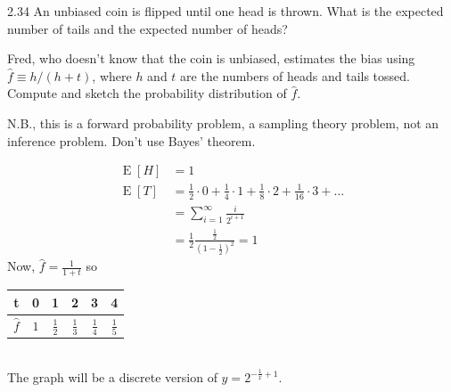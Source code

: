 \documentclass[12pt, a4paper]{article}
\begin{document}
\begin{prob}{2.34}
    An unbiased coin is flipped until one head is thrown. What is the expected number of tails and the expected number of heads?
    
    Fred, who doesn't know that the coin is unbiased, estimates the bias using $\hat{f} \equiv h/(h + t)$, where $h$ and $t$ are the numbers of heads and tails tossed. Compute and sketch the probability distribution of $\hat{f}$.
    
    N.B., this is a forward probability problem, a sampling theory problem, not an inference problem. Don't use Bayes' theorem.
\end{prob}
\begin{sol}
    \begin{align*}
    \operatorname{E}[H] &= 1 \\
    \operatorname{E}[T] &= \frac{1}{2} \cdot 0 + \frac{1}{4} \cdot 1 + \frac{1}{8} \cdot 2 + \frac{1}{16} \cdot 3 + \dots \\
    &= \sum_{i=1}^{\infty} \frac{i}{2^{i+1}} \\
    &= \frac{1}{2}\frac{\frac{1}{2}}{(1-\frac{1}{2})^2} = 1
    \end{align*}
    Now,
    $\hat{f} = \frac{1}{1+t}$ so \\

    \begin{tabular}{c|c|c|c|c|c}
        t & 0 & 1 & 2 & 3 & 4 \\
        \hline
        $\hat{f}$ & $1$ & $\frac{1}{2}$ & $\frac{1}{3}$ & $\frac{1}{4}$ & $\frac{1}{5}$
    \end{tabular}
    \\

    The graph will be a discrete version of $y = 2^{-\frac{1}{x} + 1}$.
\end{sol}
\bigskip
\end{document}
